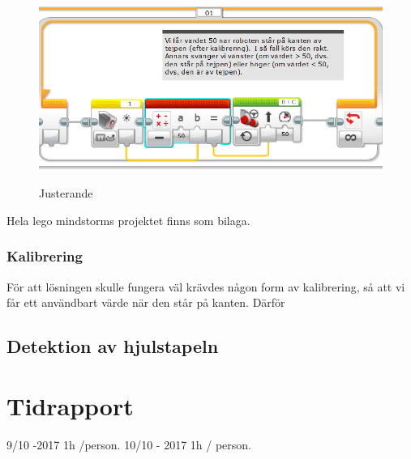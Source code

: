 \documentclass[12pt,a4paper]{article}
\begin{document}
\begin{figure}[H]
	\caption{Justerande}
	\centering
	\includegraphics[scale=0.8]{legmindfollow}
	\label{fig8:linefollow}
\end{figure}
Hela lego mindstorms projektet finns som bilaga. 
\subsubsection{Kalibrering}
För att lösningen skulle fungera väl krävdes någon form av kalibrering, så att vi får ett användbart värde när den står på kanten. Därför 
\subsection{Detektion av hjulstapeln}

\section{Tidrapport}
9/10 -2017 1h /person. 
10/10 - 2017 1h / person. 
\end{document}
